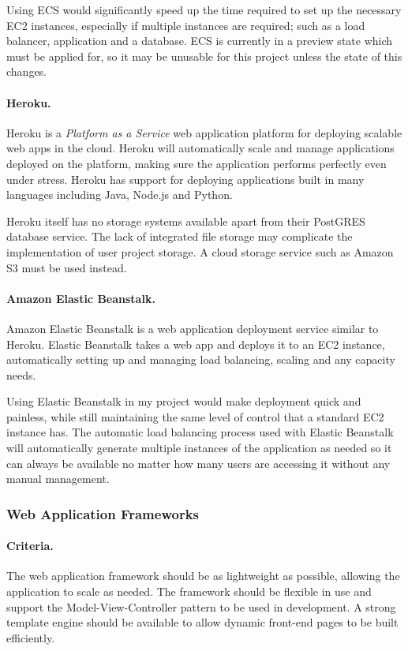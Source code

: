 \documentclass[a4paper, 12pt]{article}
\begin{document}
Using ECS would significantly speed up the time required to set up the necessary EC2 instances, especially if multiple instances are required; such as a load balancer, application and a database. ECS is currently in a preview state which must be applied for, so it may be unusable for this project unless the state of this changes.

\paragraph{Heroku.}
Heroku is a \emph{Platform as a Service} web application platform for deploying scalable web apps in the cloud. Heroku will automatically scale and manage applications deployed on the platform, making sure the application performs perfectly even under stress.\cite{heroku} Heroku has support for deploying applications built in many languages including Java, Node.js and Python.

Heroku itself has no storage systems available apart from their PostGRES database service. The lack of integrated file storage may complicate the implementation of user project storage. A cloud storage service such as Amazon S3 must be used instead.

\paragraph{Amazon Elastic Beanstalk.}
Amazon Elastic Beanstalk is a web application deployment service similar to Heroku. Elastic Beanstalk takes a web app and deploys it to an EC2 instance, automatically setting up and managing load balancing, scaling and any capacity needs.\cite{awselasticbeanstalk}

Using Elastic Beanstalk in my project would make deployment quick and painless, while still maintaining the same level of control that a standard EC2 instance has. The automatic load balancing process used with Elastic Beanstalk will automatically generate multiple instances of the application as needed so it can always be available no matter how many users are accessing it without any manual management.

\subsubsection{Web Application Frameworks}
\paragraph{Criteria.}
The web application framework should be as lightweight as possible, allowing the application to scale as needed. The framework should be flexible in use and support the Model-View-Controller pattern to be used in development. A strong template engine should be available to allow dynamic front-end pages to be built efficiently.
\end{document}
